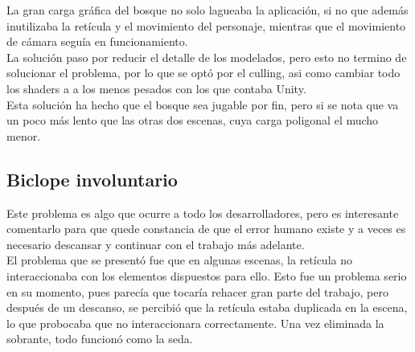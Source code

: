 \quad La gran carga gráfica del bosque no solo lagueaba la aplicación, si no que además inutilizaba la retícula y el movimiento del personaje, mientras que el movimiento de cámara seguía en funcionamiento.\\

\quad La solución paso por reducir el detalle de los modelados, pero esto no termino de solucionar el problema, por lo que se optó por el culling, asi como cambiar todo los shaders a a los menos pesados con los que contaba Unity.\\

\quad Esta solución ha hecho que el bosque sea jugable por fin, pero si se nota que va un poco más lento que las otras dos escenas, cuya carga poligonal el mucho menor.\\  

\subsection{Biclope involuntario}

\quad Este problema es algo que ocurre a todo los desarrolladores, pero es interesante comentarlo para que quede constancia de que el error humano existe y a veces es necesario descansar y continuar con el trabajo más adelante.\\

\quad El problema que se presentó fue que en algunas escenas, la retícula no interaccionaba con los elementos dispuestos para ello. Esto fue un problema serio en su momento, pues parecía que tocaría rehacer gran parte del trabajo, pero después de un descanso, se percibió que la retícula estaba duplicada en la escena, lo que probocaba que no interaccionara correctamente. Una vez eliminada la sobrante, todo funcionó como la seda.\\

\newpage





